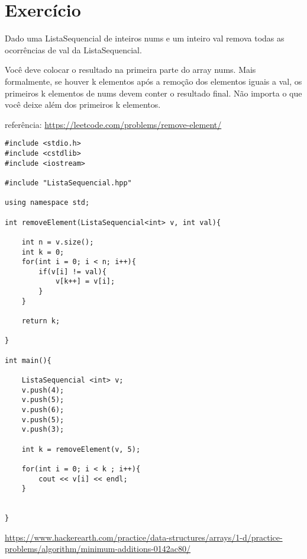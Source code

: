 \section{Exercício}


Dado uma ListaSequencial de inteiros nums e um inteiro val remova todas as ocorrências de val da ListaSequencial.

Você deve colocar o resultado na primeira parte do array nums. Mais formalmente, se houver k elementos após a remoção dos elementos iguais a val, os primeiros k elementos de nums devem conter o resultado final. Não importa o que você deixe além dos primeiros k elementos.

referência: \url{https://leetcode.com/problems/remove-element/}

\begin{verbatim}
#include <stdio.h>
#include <cstdlib>
#include <iostream>

#include "ListaSequencial.hpp"

using namespace std;

int removeElement(ListaSequencial<int> v, int val){

    int n = v.size();
    int k = 0;
    for(int i = 0; i < n; i++){
        if(v[i] != val){
            v[k++] = v[i];
        }
    }

    return k;

}

int main(){

    ListaSequencial <int> v;
    v.push(4);
    v.push(5);
 	v.push(6);
    v.push(5);
    v.push(3);

    int k = removeElement(v, 5);

    for(int i = 0; i < k ; i++){
        cout << v[i] << endl;
    }


}

\end{verbatim}


\url{https://www.hackerearth.com/practice/data-structures/arrays/1-d/practice-problems/algorithm/minimum-additions-0142ac80/}



